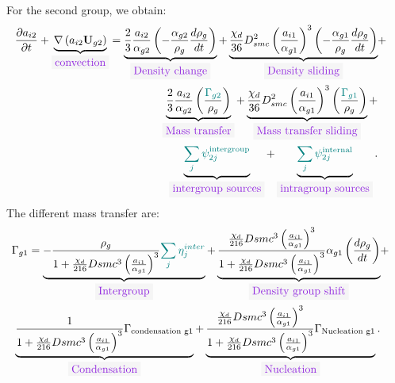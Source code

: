 For the second group, we obtain:
\begin{equation}
\begin{aligned}
\frac{\partial a_{i2}}{\partial t}+\underbrace{\nabla\parent{a_{i2}\mathbf{U}_{g2}}}_{\colorbox{codebackground}{\color{codekeyword3} convection}}=\underbrace{\frac{2}{3}\frac{a_{i2}}{\alpha_{g2}}\parent{-\frac{\alpha_{g2}}{\rho_g}\frac{d \rho_g}{dt}}}_{\colorbox{codebackground}{\color{codekeyword3} Density\ change}}+\underbrace{\frac{\chi_d}{36}D_{smc}^2\parent{\frac{a_{i1}}{\alpha_{g1}}}^3\parent{-\frac{\alpha_{g1}}{\rho_g}\frac{d \rho_g}{dt}}}_{\colorbox{codebackground}{\color{codekeyword3} Density\ sliding}}&+ & \\
\underbrace{\frac{2}{3}\frac{a_{i2}}{\alpha_{g2}}\parent{\frac{\color{myteal}\Gamma_{g2}}{\rho_g}}}_{\colorbox{codebackground}{\color{codekeyword3} Mass\ transfer}} +\underbrace{\frac{\chi_d}{36}D_{smc}^2\parent{\frac{a_{i1}}{\alpha_{g1}}}^3\parent{\frac{\color{myteal}\Gamma_{g1}}{\rho_g} }}_{\colorbox{codebackground}{\color{codekeyword3} Mass\ transfer\ sliding}} +& \\ 
\underbrace{\color{myteal}\sum_j \psi^{\text{intergroup}}_{2j}}_{\colorbox{codebackground}{\color{codekeyword3} intergroup\ sources}} + \underbrace{\color{myteal}\sum_j \psi^{\text{internal}}_{2j}}_{\colorbox{codebackground}{\color{codekeyword3} intragroup sources}}.
\end{aligned}
\end{equation}
The different mass transfer are:
\begin{equation}
\begin{aligned}
\Gamma_{g1} = \underbrace{-\frac{\rho_g}{1+\frac{\chi_d}{216}Dsmc^3\parent{\frac{a_{i1}}{\alpha_{g1}}}^3}{\color{myteal}\sum_j \eta^{inter}_j}}_{\colorbox{codebackground}{\color{codekeyword3} Intergroup}}+ \underbrace{\frac{\frac{\chi_d}{216}Dsmc^3\parent{\frac{a_{i1}}{\alpha_{g1}}}^3}{1+\frac{\chi_d}{216}Dsmc^3\parent{\frac{a_{i1}}{\alpha_{g1}}}^3}\alpha_{g1}\parent{\frac{d\rho_{g}}{dt}}}_{\colorbox{codebackground}{\color{codekeyword3} Density\ group\ shift}}&+& \\
\underbrace{\frac{1}{1+\frac{\chi_d}{216}Dsmc^3\parent{\frac{a_{i1}}{\alpha_{g1}}}^3}\Gamma_{\text{condensation g1}}}_{\colorbox{codebackground}{\color{codekeyword3} Condensation}}+\underbrace{\frac{\frac{\chi_d}{216}Dsmc^3\parent{\frac{a_{i1}}{\alpha_{g1}}}^3}{1+\frac{\chi_d}{216}Dsmc^3\parent{\frac{a_{i1}}{\alpha_{g1}}}^3}\Gamma_{\text{Nucleation g1}}}_{\colorbox{codebackground}{\color{codekeyword3} Nucleation}}.
\end{aligned}
\end{equation}
